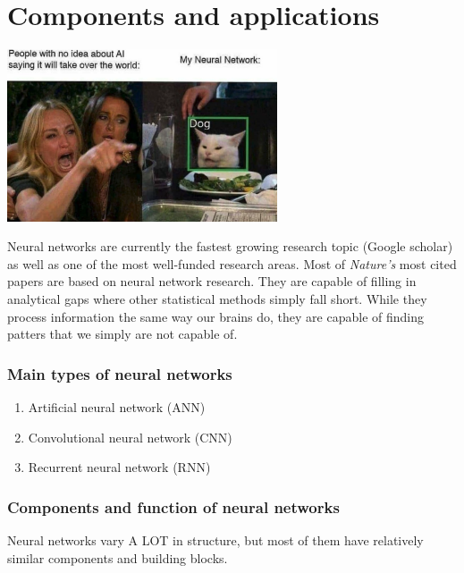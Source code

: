 \documentclass[
]{article}
\providecommand{\tightlist}{%
  \setlength{\itemsep}{0pt}\setlength{\parskip}{0pt}}
\begin{document}
\hypertarget{components-and-applications}{%
\section{Components and
applications}\label{components-and-applications}}

\includegraphics[width=0.6\textwidth,height=\textheight]{media/meme.png}

Neural networks are currently the fastest growing research topic (Google
scholar) as well as one of the most well-funded research areas. Most of
\emph{Nature's} most cited papers are based on neural network research.
They are capable of filling in analytical gaps where other statistical
methods simply fall short. While they process information the same way
our brains do, they are capable of finding patters that we simply are
not capable of.

\hypertarget{main-types-of-neural-networks}{%
\subsubsection{Main types of neural
networks}\label{main-types-of-neural-networks}}

\begin{enumerate}
\def\labelenumi{\arabic{enumi}.}
\tightlist
\item
  Artificial neural network (ANN)
\item
  Convolutional neural network (CNN)
\item
  Recurrent neural network (RNN)
\end{enumerate}

\hypertarget{components-and-function-of-neural-networks}{%
\subsubsection{Components and function of neural
networks}\label{components-and-function-of-neural-networks}}

Neural networks vary A LOT in structure, but most of them have
relatively similar components and building blocks.
\end{document}
